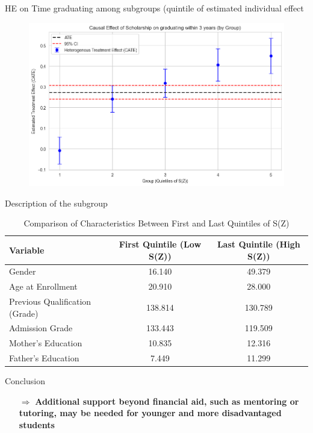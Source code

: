\documentclass[aspectratio=169]{beamer}
\begin{document}
\begin{frame}{ HE on Time graduating among subgroups (quintile of estimated individual effect }

\begin{figure}[h!]  
        \includegraphics[width=0.9\linewidth]{Tex_Pictures/HE_quintile_graduating.png} 

 
 \end{figure}   
\end{frame}



\begin{frame}{Description of the subgroup}
\begin{table}[h]
    \centering
    \begin{tabular}{l c c}
        \hline
        \textbf{Variable} & \textbf{First Quintile (Low S(Z))} & \textbf{Last Quintile (High S(Z))} \\
        \hline
        Gender & 16.140 & 49.379 \\
        Age at Enrollment & 20.910 & 28.000 \\
        Previous Qualification (Grade) & 138.814 & 130.789 \\
        Admission Grade & 133.443 & 119.509 \\
        Mother’s Education & 10.835 & 12.316 \\
        Father’s Education & 7.449 & 11.299 \\
        \hline
    \end{tabular}
    \caption{Comparison of Characteristics Between First and Last Quintiles of S(Z)}
    \label{tab:quintile_comparison_2}
\end{table}

 \begin{exampleblock}{Conclusion}
\vspace{-1pt}
\begin{itemize}
    \item [$\Rightarrow$]
\textbf{Additional support beyond financial aid, such as mentoring or tutoring, may be needed for younger and more disadvantaged students}
\end{itemize}
\vspace{-3pt}
	
\end{exampleblock}


\end{frame}
\end{document}

